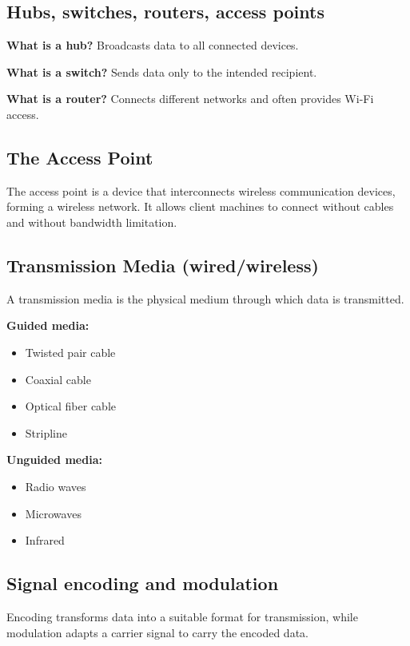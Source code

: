 \documentclass[11pt]{article}
\begin{document}
\subsection*{Hubs, switches, routers, access points}
\textbf{What is a hub?}  
Broadcasts data to all connected devices.

\textbf{What is a switch?}  
Sends data only to the intended recipient.

\textbf{What is a router?}  
Connects different networks and often provides Wi-Fi access.

\subsection*{The Access Point}
The access point is a device that interconnects wireless communication devices, forming a wireless network. It allows client machines to connect without cables and without bandwidth limitation.

\subsection*{Transmission Media (wired/wireless)}
A transmission media is the physical medium through which data is transmitted.

\textbf{Guided media:}
\begin{itemize}
    \item Twisted pair cable
    \item Coaxial cable
    \item Optical fiber cable
    \item Stripline
\end{itemize}

\textbf{Unguided media:}
\begin{itemize}
    \item Radio waves
    \item Microwaves
    \item Infrared
\end{itemize}

\subsection*{Signal encoding and modulation}
Encoding transforms data into a suitable format for transmission, while modulation adapts a carrier signal to carry the encoded data.
\end{document}
